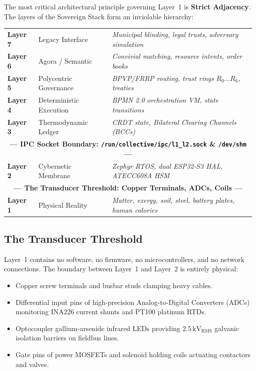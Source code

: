 The most critical architectural principle governing Layer~1 is \textbf{Strict Adjacency}. The layers of the Sovereign Stack form an inviolable hierarchy:
\begin{center}
\begin{tabular}{lll}
\textbf{Layer 7} & Legacy Interface & \textit{Municipal blinding, legal trusts, adversary simulation} \\
\textbf{Layer 6} & Agora / Semantic & \textit{Convivial matching, resource intents, order books} \\
\textbf{Layer 5} & Polycentric Governance & \textit{BPVP/FRRP routing, trust rings $R_0 \dots R_6$, treaties} \\
\textbf{Layer 4} & Deterministic Execution & \textit{BPMN 2.0 orchestration VM, state transitions} \\
\textbf{Layer 3} & Thermodynamic Ledger & \textit{CRDT state, Bilateral Clearing Channels (BCCs)} \\
\hline
\multicolumn{3}{c}{\textbf{--- IPC Socket Boundary: \texttt{/run/collective/ipc/l1\_l2.sock} \& \texttt{/dev/shm} ---}} \\
\hline
\textbf{Layer 2} & Cybernetic Membrane & \textit{Zephyr RTOS, dual ESP32-S3 HAL, ATECC608A HSM} \\
\hline
\multicolumn{3}{c}{\textbf{--- The Transducer Threshold: Copper Terminals, ADCs, Coils ---}} \\
\hline
\textbf{Layer 1} & Physical Reality & \textit{Matter, exergy, soil, steel, battery plates, human calories} \\
\end{tabular}
\end{center}

\subsection{The Transducer Threshold}
Layer~1 contains no software, no firmware, no microcontrollers, and no network connections. The boundary between Layer~1 and Layer~2 is entirely physical:
\begin{itemize}
    \item Copper screw terminals and busbar studs clamping heavy cables.
    \item Differential input pins of high-precision Analog-to-Digital Converters (ADCs) monitoring INA226 current shunts and PT100 platinum RTDs.
    \item Optocoupler gallium-arsenide infrared LEDs providing $2.5\,\mathrm{kV}_{\mathrm{RMS}}$ galvanic isolation barriers on fieldbus lines.
    \item Gate pins of power MOSFETs and solenoid holding coils actuating contactors and valves.
\end{itemize}

